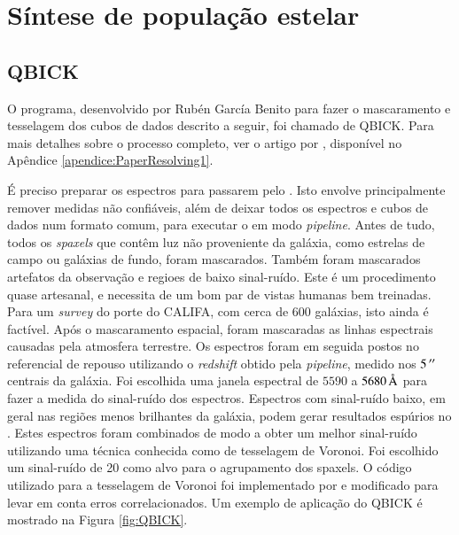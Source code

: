 \section{Síntese de população estelar}

\subsection{QBICK}
\label{sec:ifs:qbick}

O programa, desenvolvido por Rubén García Benito para fazer o mascaramento e
tesselagem dos cubos de dados descrito a seguir, foi chamado de QBICK. Para mais
detalhes sobre o processo completo, ver o artigo por \citet{CidFernandes2013},
disponível no Apêndice \ref{apendice:PaperResolving1}.

É preciso preparar os espectros para passarem pelo \starlight. Isto envolve
principalmente remover medidas não confiáveis, além de deixar todos os espectros
e cubos de dados num formato comum, para executar o \starlight em modo {\em
pipeline}. Antes de tudo, todos os {\em spaxels} que contêm luz não proveniente
da galáxia, como estrelas de campo ou galáxias de fundo, foram mascarados.
Também foram mascarados artefatos da observação e regioes de baixo sinal-ruído.
Este é um procedimento quase artesanal, e necessita de um bom par de vistas
humanas bem treinadas. Para um {\em survey} do porte do CALIFA, com cerca de 600
galáxias, isto ainda é factível. Após o mascaramento espacial, foram mascaradas
as linhas espectrais causadas pela atmosfera terrestre. Os espectros foram em
seguida postos no referencial de repouso utilizando o {\em redshift} obtido pela
{\em pipeline}, medido nos $5\,^{\prime\prime}$ centrais da galáxia. Foi escolhida uma
janela espectral de $5590$ a $5680\,\text{\normalfont\AA}$ para fazer a medida do
sinal-ruído dos espectros. Espectros com sinal-ruído baixo, em geral nas regiões
menos brilhantes da galáxia, podem gerar resultados espúrios no \starlight.
Estes espectros foram combinados de modo a obter um melhor sinal-ruído
utilizando uma técnica conhecida como de tesselagem de Voronoi. Foi escolhido um
sinal-ruído de 20 como alvo para o agrupamento dos spaxels. O código utilizado
para a tesselagem de Voronoi foi implementado por \citet{Cappellari2003} e
modificado para levar em conta erros correlacionados. Um exemplo de aplicação do
QBICK é mostrado na Figura \ref{fig:QBICK}.

